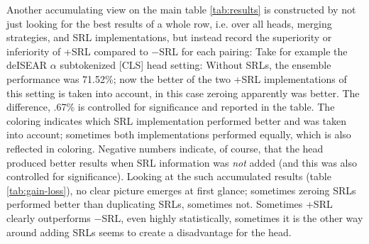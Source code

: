 
Another accumulating view on the main table \ref{tab:results} is constructed by not just
looking for the best results of a whole row, i.e. over all heads, merging strategies,
and SRL implementations, but instead record the superiority or inferiority of +SRL
compared to $-$SRL for each pairing: Take for example the deISEAR $\alpha$ subtokenized
[CLS] head setting: Without SRLs, the ensemble performance was 71.52\%; now the better
of the two +SRL implementations of this setting is taken into account, in this case
zeroing apparently was better. The difference, .67\% is controlled for significance and
reported in the table. The coloring indicates which SRL implementation performed better
and was taken into account; sometimes both implementations performed equally, which is
also reflected in coloring. Negative numbers indicate, of course, that the head produced
better results when SRL information was \emph{not} added (and this was also controlled
for significance).
Looking at the such accumulated results (table \ref{tab:gain-loss}), no clear picture emerges
at first glance; sometimes zeroing SRLs performed better than duplicating SRLs, sometimes not.
Sometimes +SRL clearly outperforms $-$SRL, even highly statistically, sometimes it is
the other way around adding SRLs seems to create a disadvantage for the head.

